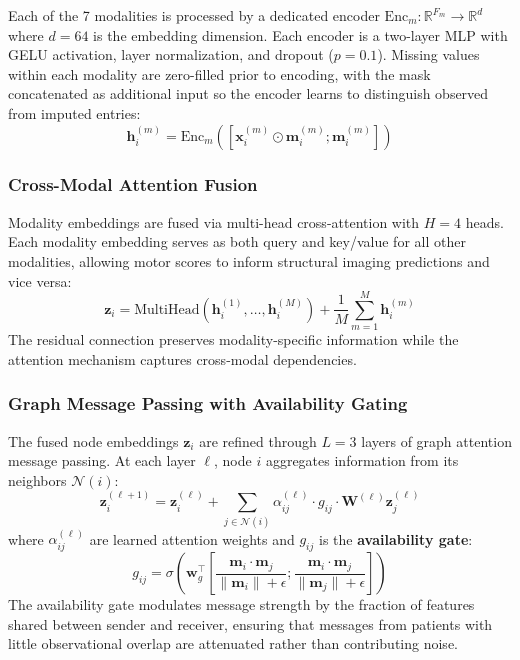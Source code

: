 \documentclass[journal,twoside,web]{ieeecolor}
\begin{document}
Each of the 7 modalities is processed by a dedicated encoder $\text{Enc}_m: \mathbb{R}^{F_m} \rightarrow \mathbb{R}^{d}$ where $d = 64$ is the embedding dimension. Each encoder is a two-layer MLP with GELU activation, layer normalization, and dropout ($p = 0.1$). Missing values within each modality are zero-filled prior to encoding, with the mask concatenated as additional input so the encoder learns to distinguish observed from imputed entries:
\begin{equation}
    \mathbf{h}_i^{(m)} = \text{Enc}_m([\mathbf{x}_i^{(m)} \odot \mathbf{m}_i^{(m)}; \mathbf{m}_i^{(m)}])
\end{equation}

\subsubsection{Cross-Modal Attention Fusion}

Modality embeddings are fused via multi-head cross-attention with $H = 4$ heads. Each modality embedding serves as both query and key/value for all other modalities, allowing motor scores to inform structural imaging predictions and vice versa:
\begin{equation}
    \mathbf{z}_i = \text{MultiHead}(\mathbf{h}_i^{(1)}, \ldots, \mathbf{h}_i^{(M)}) + \frac{1}{M}\sum_{m=1}^{M} \mathbf{h}_i^{(m)}
\end{equation}
The residual connection preserves modality-specific information while the attention mechanism captures cross-modal dependencies.

\subsubsection{Graph Message Passing with Availability Gating}

The fused node embeddings $\mathbf{z}_i$ are refined through $L = 3$ layers of graph attention message passing. At each layer $\ell$, node $i$ aggregates information from its neighbors $\mathcal{N}(i)$:
\begin{equation}
    \mathbf{z}_i^{(\ell+1)} = \mathbf{z}_i^{(\ell)} + \sum_{j \in \mathcal{N}(i)} \alpha_{ij}^{(\ell)} \cdot g_{ij} \cdot \mathbf{W}^{(\ell)} \mathbf{z}_j^{(\ell)}
\end{equation}
where $\alpha_{ij}^{(\ell)}$ are learned attention weights and $g_{ij}$ is the \textbf{availability gate}:
\begin{equation}
    g_{ij} = \sigma\left(\mathbf{w}_g^\top \left[\frac{\mathbf{m}_i \cdot \mathbf{m}_j}{\|\mathbf{m}_i\| + \epsilon}; \frac{\mathbf{m}_i \cdot \mathbf{m}_j}{\|\mathbf{m}_j\| + \epsilon}\right]\right)
\end{equation}
The availability gate modulates message strength by the fraction of features shared between sender and receiver, ensuring that messages from patients with little observational overlap are attenuated rather than contributing noise.
\end{document}
